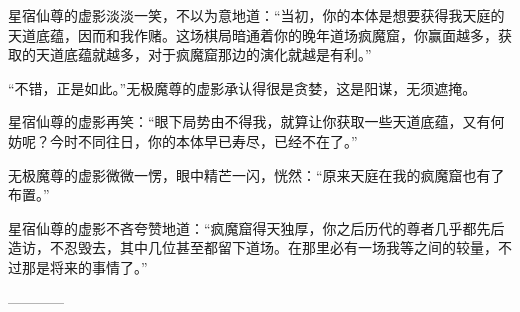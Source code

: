 \begin{this_body}
星宿仙尊的虚影淡淡一笑，不以为意地道：“当初，你的本体是想要获得我天庭的天道底蕴，因而和我作赌。这场棋局暗通着你的晚年道场疯魔窟，你赢面越多，获取的天道底蕴就越多，对于疯魔窟那边的演化就越是有利。”

“不错，正是如此。”无极魔尊的虚影承认得很是贪婪，这是阳谋，无须遮掩。

星宿仙尊的虚影再笑：“眼下局势由不得我，就算让你获取一些天道底蕴，又有何妨呢？今时不同往日，你的本体早已寿尽，已经不在了。”

无极魔尊的虚影微微一愣，眼中精芒一闪，恍然：“原来天庭在我的疯魔窟也有了布置。”

星宿仙尊的虚影不吝夸赞地道：“疯魔窟得天独厚，你之后历代的尊者几乎都先后造访，不忍毁去，其中几位甚至都留下道场。在那里必有一场我等之间的较量，不过那是将来的事情了。”

------------

\end{this_body}

